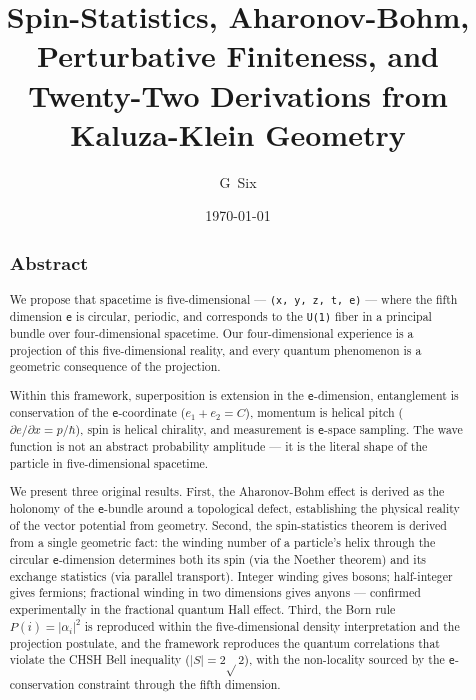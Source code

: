 \documentclass[aps,prd,preprint,superscriptaddress,longbibliography,floatfix]{revtex4-2}
\theoremstyle{remark}
\begin{document}
\title{Spin-Statistics, Aharonov-Bohm, Perturbative Finiteness, and Twenty-Two Derivations from Kaluza-Klein Geometry}
\author{G~Six}
\date{\today}

\begin{abstract}


\subsection{Abstract}

We propose that spacetime is five-dimensional --- \texttt{(x, y, z, t, e)} --- where the fifth dimension \texttt{e} is circular, periodic, and corresponds to the \texttt{U(1)} fiber in a principal bundle over four-dimensional spacetime. Our four-dimensional experience is a projection of this five-dimensional reality, and every quantum phenomenon is a geometric consequence of the projection.

Within this framework, superposition is extension in the \texttt{e}-dimension, entanglement is conservation of the \texttt{e}-coordinate ($e_{1} + e_{2} = C$), momentum is helical pitch ($\partial e/\partial x = p/\hbar$), spin is helical chirality, and measurement is \texttt{e}-space sampling. The wave function is not an abstract probability amplitude --- it is the literal shape of the particle in five-dimensional spacetime.

We present three original results. First, the Aharonov-Bohm effect is derived as the holonomy of the \texttt{e}-bundle around a topological defect, establishing the physical reality of the vector potential from geometry. Second, the spin-statistics theorem is derived from a single geometric fact: the winding number of a particle's helix through the circular \texttt{e}-dimension determines both its spin (via the Noether theorem) and its exchange statistics (via parallel transport). Integer winding gives bosons; half-integer gives fermions; fractional winding in two dimensions gives anyons --- confirmed experimentally in the fractional quantum Hall effect. Third, the Born rule $P(i) = |\alpha_{i}|^{2}$ is reproduced within the five-dimensional density interpretation and the projection postulate, and the framework reproduces the quantum correlations that violate the CHSH Bell inequality ($|S| = 2\sqrt{}2$), with the non-locality sourced by the \texttt{e}-conservation constraint through the fifth dimension.


\end{abstract}
\end{document}
